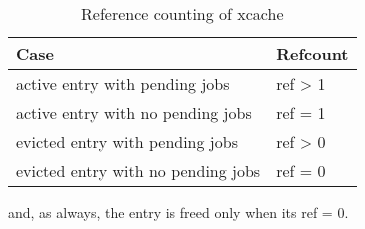 \begin{table}[tbp]
	\centering
	\begin{tabular}{ | l | l | }
		\hline
		Case & Refcount \\ \hline \hline
		active entry with pending jobs & ref > 1 \\ \hline
		active entry with no pending jobs & ref = 1 \\ \hline
		evicted entry with pending jobs & ref > 0 \\ \hline
		evicted entry with no pending jobs & ref = 0 \\ \hline
	\end{tabular}
	\caption{Reference counting of xcache}
	\label{tab:refcount}
\end{table}

and, as always, the entry is freed only when its ref = 0.

